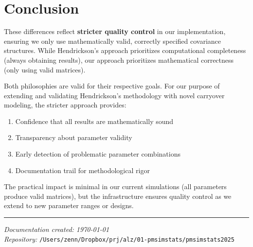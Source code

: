 \documentclass[11pt]{article}
\begin{document}
\section{Conclusion}

These differences reflect \textbf{stricter quality control} in our implementation, ensuring we only use mathematically valid, correctly specified covariance structures. While Hendrickson's approach prioritizes computational completeness (always obtaining results), our approach prioritizes mathematical correctness (only using valid matrices).

Both philosophies are valid for their respective goals. For our purpose of extending and validating Hendrickson's methodology with novel carryover modeling, the stricter approach provides:
\begin{enumerate}
    \item Confidence that all results are mathematically sound
    \item Transparency about parameter validity
    \item Early detection of problematic parameter combinations
    \item Documentation trail for methodological rigor
\end{enumerate}

The practical impact is minimal in our current simulations (all parameters produce valid matrices), but the infrastructure ensures quality control as we extend to new parameter ranges or designs.

\vspace{1cm}

\noindent\rule{\textwidth}{0.4pt}

\noindent\textit{Documentation created: \today}\\
\textit{Repository:} \texttt{/Users/zenn/Dropbox/prj/alz/01-pmsimstats/pmsimstats2025}
\end{document}
